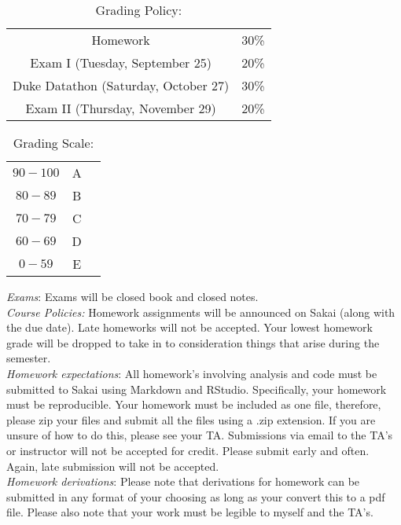 \documentclass[11pt]{article}
\begin{document}
\begin{table}[ht]
\caption{Grading Policy:}
\begin{center}
\begin{tabular}{cc}
Homework & 30\%\\
Exam I (Tuesday, September 25) &20\%\\
Duke Datathon (Saturday, October 27) & 30\%\\
Exam  II (Thursday, November 29) & 20\%\\

\end{tabular}
\end{center}
\label{default}
\end{table}%

\begin{table}[ht]
\caption{Grading Scale:}
\begin{center}
\begin{tabular}{ccc}
$90-100$ &A\\
$80-89$ & B\\
$70-79$ & C\\
$60-69$ & D\\
$0-59$ &  E\\
\end{tabular}
\end{center}
\label{default}
\end{table}%

\emph{Exams}: Exams will be closed book and closed notes.\\

\emph{Course Policies:} 
Homework assignments will be announced on Sakai (along with the due date). Late homeworks will not be accepted. Your lowest homework grade will be dropped to take in to consideration things that arise during the semester. \\

\emph{Homework expectations}: All homework's involving analysis and code must be submitted to Sakai using Markdown and RStudio. Specifically, your homework must be reproducible. Your homework must be included as one file, therefore, please zip your files and submit all the files using a .zip extension. If you are unsure of how to do this, please see your TA. Submissions via email to the TA's or instructor will not be accepted for credit. Please submit early and often. Again, late submission will not be accepted. \\

\emph{Homework derivations}: Please note that derivations for homework can be submitted in any format of your choosing as long as your convert this to a pdf file. Please also note that your work must be legible to myself and the TA's. \\
\end{document}
